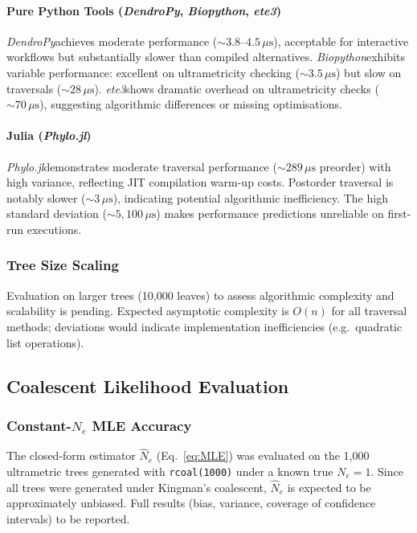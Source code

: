 \documentclass[11pt, a4paper]{article}
\newcommand{\dendropy}{\textit{DendroPy}}
\newcommand{\biopython}{\textit{Biopython}}
\newcommand{\ete}{\textit{ete3}}
\newcommand{\phylo}{\textit{Phylo.jl}}
\begin{document}
\paragraph{Pure Python Tools (\dendropy, \biopython, \ete)}

\dendropy achieves moderate performance ($\sim 3.8$--$4.5\,\mu\text{s}$), acceptable
for interactive workflows but substantially slower than compiled alternatives.
\biopython exhibits variable performance: excellent on ultrametricity checking
($\sim 3.5\,\mu\text{s}$) but slow on traversals ($\sim 28\,\mu\text{s}$).
\ete shows dramatic overhead on ultrametricity checks ($\sim 70\,\mu\text{s}$),
suggesting algorithmic differences or missing optimisations.

\paragraph{Julia (\phylo)}

\phylo demonstrates moderate traversal performance ($\sim 289\,\mu\text{s}$
preorder) with high variance, reflecting JIT compilation warm-up costs.
Postorder traversal is notably slower ($\sim 3\,\mu\text{s}$), indicating potential
algorithmic inefficiency. The high standard deviation ($\sim 5{,}100\,\mu\text{s}$)
makes performance predictions unreliable on first-run executions.

\subsubsection{Tree Size Scaling}

Evaluation on larger trees (10{,}000 leaves) to assess algorithmic complexity and
scalability is pending. Expected asymptotic complexity is $O(n)$ for all traversal
methods; deviations would indicate implementation inefficiencies (e.g.\ quadratic
list operations).

\subsection{Coalescent Likelihood Evaluation}

\subsubsection{Constant-$N_e$ MLE Accuracy}

The closed-form estimator $\hat{N}_e$ (Eq.~\ref{eq:MLE}) was evaluated on the 1{,}000
ultrametric trees generated with \texttt{rcoal(1000)} under a known true $N_e = 1$.
Since all trees were generated under Kingman's coalescent, $\hat{N}_e$ is expected to
be approximately unbiased.
Full results (bias, variance, coverage of confidence intervals) to be reported.
\end{document}
